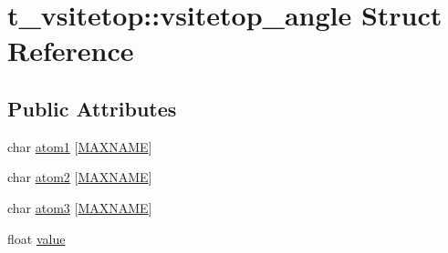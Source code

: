 \hypertarget{structt__vsitetop_1_1vsitetop__angle}{\section{t\-\_\-vsitetop\-:\-:vsitetop\-\_\-angle \-Struct \-Reference}
\label{structt__vsitetop_1_1vsitetop__angle}
}
\subsection*{\-Public \-Attributes}
\begin{DoxyCompactItemize}
\item 
char \hyperlink{structt__vsitetop_1_1vsitetop__angle_aa266fb535de5f7103d5c908dcf2a004d}{atom1} \mbox{[}\hyperlink{gen__vsite_8c_ac881f02a50b29d3ffa5b1f4a0e4f9568}{\-M\-A\-X\-N\-A\-M\-E}\mbox{]}
\item 
char \hyperlink{structt__vsitetop_1_1vsitetop__angle_a005219e34f638294a3e2842bedcc8746}{atom2} \mbox{[}\hyperlink{gen__vsite_8c_ac881f02a50b29d3ffa5b1f4a0e4f9568}{\-M\-A\-X\-N\-A\-M\-E}\mbox{]}
\item 
char \hyperlink{structt__vsitetop_1_1vsitetop__angle_a1fc40ea70f5065575f82b929ff0656e2}{atom3} \mbox{[}\hyperlink{gen__vsite_8c_ac881f02a50b29d3ffa5b1f4a0e4f9568}{\-M\-A\-X\-N\-A\-M\-E}\mbox{]}
\item 
float \hyperlink{structt__vsitetop_1_1vsitetop__angle_a75e916300d66d8a27ad25d24498a1a6b}{value}
\end{DoxyCompactItemize}



